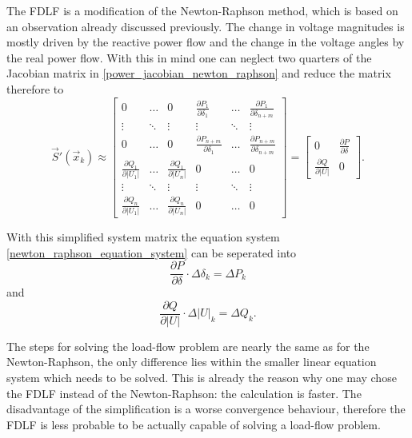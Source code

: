 The FDLF is a modification of the Newton-Raphson method, which is based on an observation already discussed previously. The change in voltage magnitudes is mostly driven by the reactive power flow and the change in the voltage angles by the real power flow. With this in mind one can neglect two quarters of the Jacobian matrix in \eqref{power_jacobian_newton_raphson} and reduce the matrix therefore to
\begin{equation}
	\vec S' (\vec x_k) \approx 
	\begin{bmatrix}
		0	& \hdots	& 0	& \frac{\partial P_1}{\partial \delta_1}	& \hdots	& \frac{\partial P_1}{\partial \delta_{n + m}} \\
		\vdots								& \ddots	& \vdots								& \vdots									& \ddots	& \vdots \\
		0	& \hdots	& 0	& \frac{\partial P_{n + m}}{\partial \delta_1}	& \hdots	& \frac{\partial P_{n + m}}{\partial \delta_{n + m}} \\
		\frac{\partial Q_1}{\partial |U_1|}	& \hdots	& \frac{\partial Q_1}{\partial |U_n|}	& 0	& \hdots	& 0 \\
		\vdots								& \ddots	& \vdots								& \vdots									& \ddots	& \vdots \\
		\frac{\partial Q_n}{\partial |U_1|}	& \hdots	& \frac{\partial Q_n}{\partial |U_n|}	& 0	& \hdots	& 0
	\end{bmatrix} =
	\begin{bmatrix}
		0								&	\frac{\partial P}{\partial \delta} \\
		\frac{\partial Q}{\partial |U|}	&	0
	\end{bmatrix}.
\end{equation}

With this simplified system matrix the equation system \eqref{newton_raphson_equation_system} can be seperated into
\begin{equation}
	\frac{\partial P}{\partial \delta} \cdot \Delta \delta_k = \Delta P_k
\end{equation}
and
\begin{equation}
	\frac{\partial Q}{\partial |U|} \cdot \Delta |U|_k = \Delta Q_k.
\end{equation}

The steps for solving the load-flow problem are nearly the same as for the Newton-Raphson, the only difference lies within the smaller linear equation system which needs to be solved. This is already the reason why one may chose the FDLF instead of the Newton-Raphson: the calculation is faster. The disadvantage of the simplification is a worse convergence behaviour, therefore the FDLF is less probable to be actually capable of solving a load-flow problem.

